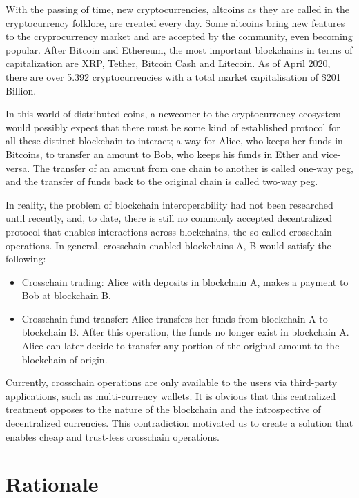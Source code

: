 With the passing of time, new cryptocurrencies, altcoins as they are called in
the cryptocurrency folklore, are created every day. Some altcoins bring new
features to the cryprocurrency market and are accepted by the community, even
becoming popular. After Bitcoin and Ethereum, the most important blockchains in
terms of capitalization are XRP, Tether, Bitcoin Cash and Litecoin. As of April
2020, there are over 5.392 cryptocurrencies with a total market capitalisation of
\$201 Billion.

In this world of distributed coins, a newcomer to the cryptocurrency ecosystem
would possibly expect that there must be some kind of established protocol for
all these distinct blockchain to interact; a way for Alice, who keeps her funds
in Bitcoins, to transfer an amount to Bob, who keeps his funds in Ether and
vice-versa. The transfer of an amount from one chain to another is called
one-way peg, and the transfer of funds back to the original chain is called
two-way peg.

In reality, the problem of blockchain interoperability had not been researched
until recently, and, to date, there is still no commonly accepted decentralized
protocol that enables interactions across blockchains, the so-called crosschain
operations. In general, crosschain-enabled blockchains A, B would satisfy the
following:

\begin{itemize}

    \item Crosschain trading: Alice with deposits in blockchain A, makes a
        payment to Bob at blockchain B.

    \item Crosschain fund transfer: Alice transfers her funds from blockchain A
        to blockchain B. After this operation, the funds no longer exist in
        blockchain A. Alice can later decide to transfer any portion of the
        original amount to the blockchain of origin.

\end{itemize}

Currently, crosschain operations are only available to the users via
third-party applications, such as multi-currency wallets. It is obvious that
this centralized treatment opposes to the nature of the blockchain and the
introspective of decentralized currencies. This contradiction motivated us to
create a solution that enables cheap and trust-less crosschain operations.

\section{Rationale}

